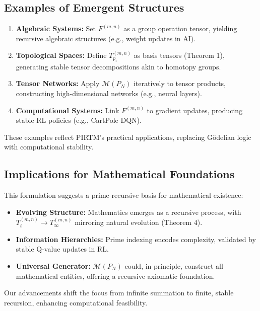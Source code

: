 \documentclass{article}
\theoremstyle{plain}
\begin{document}
\subsection{Examples of Emergent Structures}
\begin{enumerate}
    \item \textbf{Algebraic Systems:} Set \( F^{(m,n)} \) as a group operation tensor, yielding recursive algebraic structures (e.g., weight updates in AI).
    \item \textbf{Topological Spaces:} Define \( T_{p_i}^{(m,n)} \) as basis tensors (Theorem 1), generating stable tensor decompositions akin to homotopy groups.
    \item \textbf{Tensor Networks:} Apply \( \mathcal{M}(P_N) \) iteratively to tensor products, constructing high-dimensional networks (e.g., neural layers).
    \item \textbf{Computational Systems:} Link \( F^{(m,n)} \) to gradient updates, producing stable RL policies (e.g., CartPole DQN).
\end{enumerate}
These examples reflect PIRTM’s practical applications, replacing Gödelian logic with computational stability.

\subsection{Implications for Mathematical Foundations}
This formulation suggests a prime-recursive basis for mathematical existence:
\begin{itemize}
    \item \textbf{Evolving Structure:} Mathematics emerges as a recursive process, with \( T_t^{(m,n)} \to T_\infty^{(m,n)} \) mirroring natural evolution (Theorem 4).
    \item \textbf{Information Hierarchies:} Prime indexing encodes complexity, validated by stable Q-value updates in RL.
    \item \textbf{Universal Generator:} \( \mathcal{M}(P_N) \) could, in principle, construct all mathematical entities, offering a recursive axiomatic foundation.
\end{itemize}
Our advancements shift the focus from infinite summation to finite, stable recursion, enhancing computational feasibility.

\nocite{*}


\end{document}
